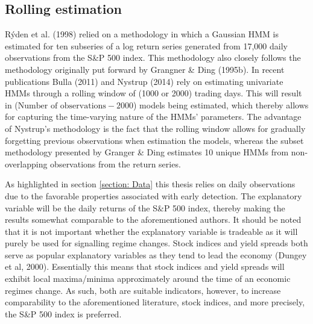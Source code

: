 \subsection{Rolling estimation}
\label{Sec: rolling estimation}
Rýden et al. (1998) relied on a methodology in which a Gaussian HMM is estimated for ten subseries of a log return series generated from 17,000 daily observations from the S\&P 500 index. This methodology also closely follows the methodology originally put forward by Grangner \& Ding (1995b). In recent publications Bulla (2011) and Nystrup (2014) rely on estimating univariate HMMs through a rolling window of (1000 or 2000) trading days. This will result in ($\text{Number of observations} - 2000$) models being estimated, which thereby allows for capturing the time-varying nature of the HMMs' parameters. The advantage of Nystrup's methodology is the fact that the rolling window allows for gradually forgetting previous observations when estimation the models, whereas the subset methodology presented by Granger \& Ding estimates 10 unique HMMs from non-overlapping observations from the return series. 

As highlighted in section \ref{section: Data} this thesis relies on daily observations due to the favorable properties associated with early detection. The explanatory variable will be the daily returns of the S\&P 500 index, thereby making the results somewhat comparable to the aforementioned authors. It should be noted that it is not important whether the explanatory variable is tradeable as it will purely be used for signalling regime changes. Stock indices and yield spreads both serve as popular explanatory variables as they tend to lead the economy (Dungey et al, 2000). Essentially this means that stock indices and yield spreads will exhibit local maxima/minima approximately around the time of an economic regimes change. As such, both are suitable indicators, however, to increase comparability to the aforementioned literature, stock indices, and more precisely, the S\&P 500 index is preferred. 

